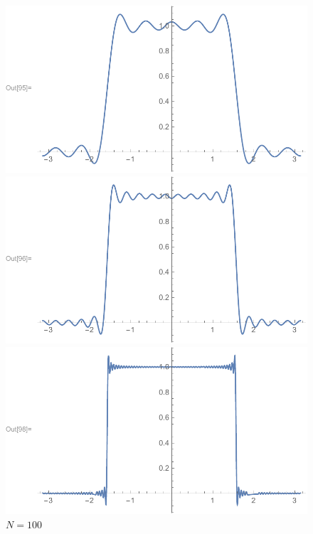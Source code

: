 \documentclass{article}
\begin{document}
\begin{figure}[H]
  \centering
  \begin{minipage}[b]{0.49\textwidth}
    \includegraphics[width=\textwidth]{part3_plot1.pdf}
    \caption{$N=10$}

  \end{minipage}
  \hfill
  \begin{minipage}[b]{0.49\textwidth}
    \includegraphics[width=\textwidth]{part3_plot2.pdf}
    \caption{$N=20$}

  \end{minipage}
    \hfill
  \begin{minipage}[b]{0.49\textwidth}
    \includegraphics[width=\textwidth]{part3_plot3.pdf}
    \caption{$N=100$}


\end{minipage}
\end{figure}
\end{document}
